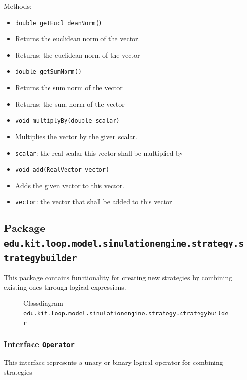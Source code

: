 \documentclass[parskip=full,11pt]{scrartcl}
\begin{document}
Methods:
\begin{itemize}\itemsep -10pt
\item \texttt{double getEuclideanNorm()}
\item[] Returns the euclidean norm of the vector.
\item[] Returns: the euclidean norm of the vector

\item \texttt{double getSumNorm()}
\item[] Returns the sum norm of the vector
\item[] Returns: the sum norm of the vector

\item \texttt{void multiplyBy(double scalar)}
\item[] Multiplies the vector by the given scalar.
\item[] \texttt{scalar}: the real scalar this vector shall be multiplied by

\item \texttt{void add(RealVector vector)}
\item[] Adds the given vector to this vector.
\item[] \texttt{vector}: the vector that shall be added to this vector
\end{itemize}
\newpage
\subsection{Package \texttt{edu.kit.loop.model.simulationengine.strategy.strategybuilder}}

This package contains functionality for creating new strategies by combining existing ones through logical expressions.

\iftrue
\begin{figure}[h]
	\centering
	\fontsize{6.75}{8}\selectfont
	

	\caption{Classdiagram \texttt{edu.kit.loop.model.simulationengine.strategy.strategybuilder}}
\end{figure}
\fi


\subsubsection{Interface \texttt{Operator}}

This interface represents a unary or binary logical operator for combining strategies.
\end{document}

